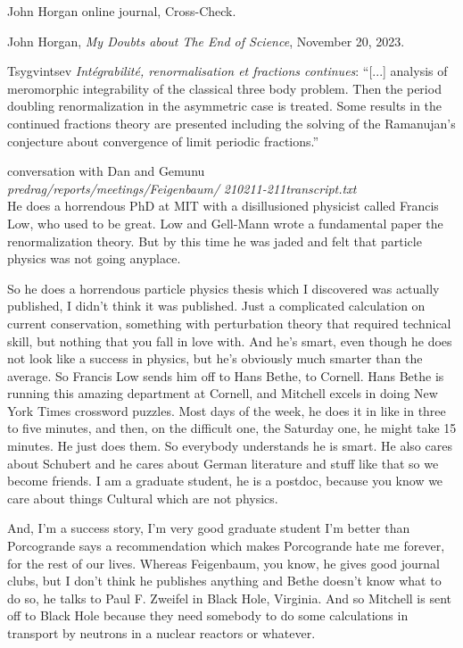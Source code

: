 \begin{description}
John Horgan online journal, 
 {Cross-Check}.

{John Horgan},
{\em My Doubts about The End of Science}, November 20, 2023.

\item[2019-10-05 Predrag]
Tsygvintsev
{\em Int{\'e}grabilit{\'e}, renormalisation et fractions continues}:
``[...] analysis of meromorphic integrability of the classical three body
problem. Then the period doubling renormalization in the asymmetric case
is treated. Some results in the continued fractions theory are presented
including the solving of the Ramanujan's conjecture about convergence of
limit periodic fractions.''

\item[2021-02-11 Predrag] conversation with Dan and Gemunu\\
\emph{predrag/reports/meetings/Feigenbaum/}
\emph{210211-211transcript.txt}\\

He does a horrendous PhD at MIT with a disillusioned physicist
called Francis Low, who used to be great. Low and Gell-Mann wrote a
fundamental paper the renormalization theory. But by this time he
was jaded and felt that particle physics was not going anyplace.

So he does a horrendous particle physics thesis which I discovered was
actually published, I didn't think it was published. Just a
complicated calculation on current conservation, something
with perturbation theory that required technical skill, but nothing
that you fall in love with. And he's smart, even though he does not
look like a success in physics, but he's obviously much smarter
than the average. So Francis Low sends him off to Hans Bethe, to
Cornell. Hans Bethe is running this amazing department at Cornell,
and Mitchell excels in doing New York Times crossword puzzles. Most
days of the week, he does it in like in three to five minutes, and
then, on the difficult one, the Saturday one, he might take 15
minutes. He just does them. So everybody understands he is smart.
He also cares about Schubert and he cares about German literature
and stuff like that so we become friends. I am a graduate student,
he is a postdoc, because you know we care about things Cultural
which are not physics.

And, I'm a success story,  I'm very good graduate student I'm
better than Porcogrande says a recommendation which makes
Porcogrande hate me forever, for the rest of our lives.
Whereas Feigenbaum, you know, he gives good journal clubs,
but I don't think he publishes anything and Bethe doesn't know what
to do so, he talks to Paul F. Zweifel in Black Hole, Virginia.
And so Mitchell is sent off to Black Hole because they need somebody to do
some calculations in transport by neutrons in a nuclear reactors
or whatever.


\end{description}
